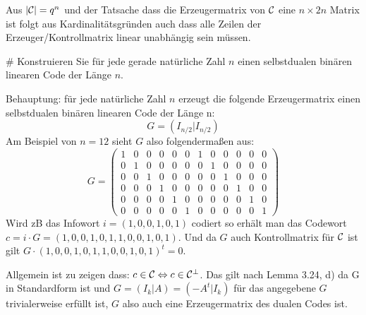 \begin{myList}
Aus $|\mathcal{C}| = q^n$ und der Tatsache dass die Erzeugermatrix von $\mathcal{C}$ eine $n \times 2n$ Matrix ist folgt aus Kardinalitätsgründen auch dass alle Zeilen der Erzeuger/Kontrollmatrix linear unabhängig sein müssen.

#
Konstruieren Sie für jede gerade natürliche Zahl $n$ einen selbstdualen binären linearen Code der Länge $n$.\medskip

Behauptung: für jede natürliche Zahl $n$ erzeugt die folgende Erzeugermatrix einen selbstdualen binären linearen Code der Länge n:
\begin{equation*}
	G = (I_{n/2} | I_{n/2})
\end{equation*}
Am Beispiel von $n = 12$ sieht $G$ also folgendermaßen aus:
\begin{equation*}
	G = 
	\begin{pmatrix}
	1 & 0 & 0 & 0 & 0 & 0 		& 1 & 0 & 0 & 0 & 0 & 0\\
	0 & 1 & 0 & 0 & 0 & 0 		& 0 & 1 & 0 & 0 & 0 & 0\\
	0 & 0 & 1 & 0 & 0 & 0 		& 0 & 0 & 1 & 0 & 0 & 0\\
	0 & 0 & 0 & 1 & 0 & 0 		& 0 & 0 & 0 & 1 & 0 & 0\\
	0 & 0 & 0 & 0 & 1 & 0 		& 0 & 0 & 0 & 0 & 1 & 0\\
	0 & 0 & 0 & 0 & 0 & 1 		& 0 & 0 & 0 & 0 & 0 & 1
	\end{pmatrix}
\end{equation*}
Wird zB das Infowort $i =(1,0,0,1,0,1)$ codiert so erhält man das Codewort $c = i \cdot G = (1,0,0,1,0,1,1,0,0,1,0,1)$. Und da $G$ auch Kontrollmatrix für $\mathcal{C}$ ist gilt $G \cdot (1,0,0,1,0,1,1,0,0,1,0,1)^t = 0$.\medskip

Allgemein ist zu zeigen dass: $c \in \mathcal{C} \Leftrightarrow c \in \mathcal{C}^\bot$.
Das gilt nach Lemma 3.24, d) da G in Standardform ist und $G = (I_k|A) = (-A^t|I_k)$ für das angegebene $G$ trivialerweise erfüllt ist, $G$ also auch eine Erzeugermatrix des dualen Codes ist.
\end{myList}
